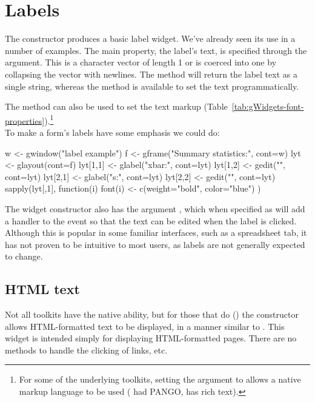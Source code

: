 \section{Labels}
\label{asec:gWidgets-labels}

The  constructor produces a basic label
widget. We've already seen its use in a number of examples. The main
property, the label's text, is specified through the
 argument. This is a character vector of length
1 or is coerced into one by collapsing the vector with newlines. The
 method will return the label text as a single
string, whereas the  method is
available to set the text programmatically.

The  method
can also be used to set the text markup
(Table~\ref{tab:gWidgets-font-properties}).\footnote{For some of the underlying toolkits, setting the argument
 to  allows a native markup language
to be used (\GTK\/ had PANGO, \Qt\/ has rich text).}
\\

To make a form's labels have some emphasis we could do:
\begin{Schunk}
\begin{Sinput}
 w <- gwindow("label example")
 f <- gframe("Summary statistics:", cont=w)
 lyt <- glayout(cont=f)
 lyt[1,1] <- glabel("xbar:", cont=lyt)
 lyt[1,2] <- gedit("", cont=lyt)
 lyt[2,1] <- glabel("s:", cont=lyt)
 lyt[2,2] <- gedit("", cont=lyt)
 sapply(lyt[,1], function(i) {
   font(i) <- c(weight="bold", color="blue")
 })
\end{Sinput}
\end{Schunk}


The widget constructor also has the argument
, which when specified as  will
add a handler to the event so that the text can be edited when the
label is clicked.  Although this is popular in some familiar
interfaces, such as a spreadsheet tab, it has not proven to be
intuitive to most users, as labels are not generally expected to change.

\subsection{HTML text}
\label{sec:html-text}

Not all toolkits have the native ability, but for those that do (\Qt) the
 constructor allows HTML-formatted text to be
displayed, in a manner similar to . This widget is
intended simply for displaying HTML-formatted pages. There are no
methods to handle the clicking of links, etc.

